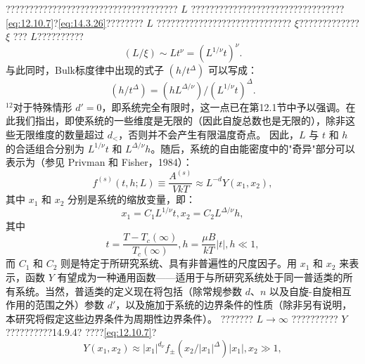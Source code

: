 ????????????????????????????????????? \(L\) ?????????????????????????????????\autoref{eq:12.10.7}?\autoref{eq:14.3.26}???????? \(L\) ????????????????????????????? \(\xi\)????????????? \(\xi\) ??? \(L\)??????????
\begin{equation}\tag{14.4.52}\label{eq:14.4.52}
( L / \xi ) \sim L t ^{\nu} = ( L ^{1 / \nu} t ) ^{\nu} .
\end{equation}
与此同时，Bulk标度律中出现的式子 \((h/t^{\Delta})\) 可以写成：
\begin{equation}\tag{14.4.53}\label{eq:14.4.53}
( h / t ^{\Delta} ) = ( h L ^{\Delta / \nu} ) / ( L ^{1 / \nu} t ) ^{\Delta} .
\end{equation}
\(^{12}\)对于特殊情形 \(d'=0\)，即系统完全有限时，这一点已在第12.1节中予以强调。在此我们指出，即使系统的一些维度是无限的（因此自旋总数也是无限的），除非这些无限维度的数量超过 \(d_{<}\)，否则并不会产生有限温度奇点。
因此，\(L\) 与 \(t\) 和 \(h\) 的合适组合分别为 \(L^{1/\nu}t\) 和 \(L^{\Delta/\nu}h\)。随后，系统的自由能密度中的"奇异"部分可以表示为（参见 Privman 和 Fisher，1984）：
\begin{equation}\tag{14.4.54}\label{eq:14.4.54}
f ^{( s )} ( t , h ; L ) \equiv \frac { A ^{( s )} } { V k T } \approx L ^{- d} Y ( x _ { 1 } , x _ { 2 } ) ,
\end{equation}
其中 \(x_{1}\) 和 \(x_{2}\) 分别是系统的缩放变量，即：
\begin{equation}\tag{14.4.55}\label{eq:14.4.55}
x _ { 1 } = C _ { 1 } L ^{1 / \nu} t ,  x _ { 2 } = C _ { 2 } L ^{\Delta / \nu} h ,
\end{equation}
其中
\begin{equation}\tag{14.4.56}\label{eq:14.4.56}
t = \frac { T - T _ { c } ( \infty ) } { T _ { c } ( \infty ) } ,  h = \frac { \mu B } { k T }  | t | , h \ll 1 ,
\end{equation}
而 \(C_{1}\) 和 \(C_{2}\) 则是特定于所研究系统、具有非普遍性的尺度因子。用 \(x_{1}\) 和 \(x_{2}\) 来表示，函数 \(Y\) 有望成为一种通用函数——适用于与所研究系统处于同一普适类的所有系统。当然，普适类的定义现在将包括（除常规参数 \(d\)、\(n\) 以及自旋-自旋相互作用的范围之外）参数 \(d'\)，以及施加于系统的边界条件的性质（除非另有说明，本研究将假定这些边界条件为周期性边界条件）。
??????? \(L \to \infty\) ?????????? \(Y\) ??????????14.9.4? ????\autoref{eq:12.10.7}?
\begin{equation}\tag{14.4.57}\label{eq:14.4.57}
Y ( x _ { 1 } , x _ { 2 } ) \approx | x _ { 1 } | ^{d _ { \nu} } f _ { \pm } ( x _ { 2 } / | x _ { 1 } | ^{\Delta} )  | x _ { 1 } | , x _ { 2 } \gg 1 ,
\end{equation}

